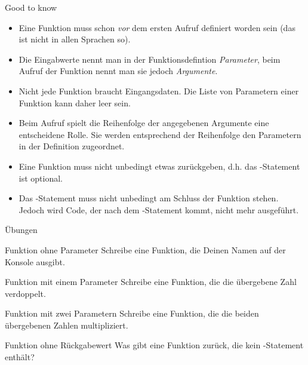 \begin{frame}

\begin{block}{Good to know}
\pause 
\begin{itemize}[<+->]
	\item Eine Funktion muss schon \emph{vor} dem ersten Aufruf definiert worden sein (das ist nicht in allen Sprachen so). 
	\item Die Eingabwerte nennt man in der Funktionsdefintion \emph{Parameter}, beim Aufruf der Funktion nennt man sie jedoch \emph{Argumente}.
	\item Nicht jede Funktion braucht Eingangsdaten. Die Liste von Parametern einer Funktion kann daher leer sein.   
	\item Beim Aufruf spielt die Reihenfolge der angegebenen Argumente eine entscheidene Rolle. Sie werden entsprechend der Reihenfolge den Parametern in der Definition zugeordnet. 
	\item Eine Funktion muss nicht unbedingt etwas zurückgeben, d.h. das -Statement ist optional.
	\item Das -Statement muss nicht unbedingt am Schluss der Funktion stehen. Jedoch wird Code, der nach dem -Statement kommt, nicht mehr ausgeführt. 
\end{itemize}
\end{block}
\end{frame}

\begin{frame}{Übungen}

\begin{block}{Funktion ohne Parameter}
	\vspace{2pt}
Schreibe eine Funktion, die Deinen Namen auf der Konsole ausgibt. 
\end{block}
\vspace{12pt}
\begin{block}{Funktion mit einem Parameter}
\vspace{2pt}
Schreibe eine Funktion, die die übergebene Zahl verdoppelt. 
\end{block}
\vspace{12pt}
\begin{block}{Funktion mit zwei Parametern}
\vspace{2pt}
Schreibe eine Funktion, die die beiden übergebenen Zahlen multipliziert. 
\end{block}
\vspace{12pt}
\begin{block}{Funktion ohne Rückgabewert}
\vspace{2pt}
Was gibt eine Funktion zurück, die kein -Statement enthält?
\end{block}
\end{frame}

